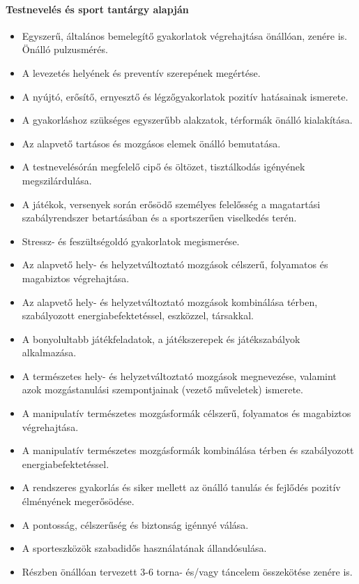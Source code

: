 \paragraph{Testnevelés és sport tantárgy alapján}
\begin{itemize}
\item Egyszerű, általános bemelegítő gyakorlatok végrehajtása önállóan, zenére is. Önálló pulzusmérés.
\item A levezetés helyének és preventív szerepének megértése.
\item A nyújtó, erősítő, ernyesztő és légzőgyakorlatok pozitív hatásainak ismerete.
\item A gyakorláshoz szükséges egyszerűbb alakzatok, térformák önálló kialakítása.
\item Az alapvető tartásos és mozgásos elemek önálló bemutatása.
\item A testnevelésórán megfelelő cipő és öltözet, tisztálkodás igényének megszilárdulása.
\item A játékok, versenyek során erősödő személyes felelősség a magatartási szabályrendszer betartásában és a sportszerűen viselkedés terén.
\item Stressz- és feszültségoldó gyakorlatok megismerése.
\item Az alapvető hely- és helyzetváltoztató mozgások célszerű, folyamatos és magabiztos végrehajtása.
\item Az alapvető hely- és helyzetváltoztató mozgások kombinálása térben, szabályozott energiabefektetéssel, eszközzel, társakkal.
\item A bonyolultabb játékfeladatok, a játékszerepek és játékszabályok alkalmazása.
\item A természetes hely- és helyzetváltoztató mozgások megnevezése, valamint azok mozgástanulási szempontjainak (vezető műveletek) ismerete.
\item A manipulatív természetes mozgásformák célszerű, folyamatos és magabiztos végrehajtása.
\item A manipulatív természetes mozgásformák kombinálása térben és szabályozott energiabefektetéssel.
\item A rendszeres gyakorlás és siker mellett az önálló tanulás és fejlődés pozitív élményének megerősödése.
\item A pontosság, célszerűség és biztonság igénnyé válása.
\item A sporteszközök szabadidős használatának állandósulása.
\item Részben önállóan tervezett 3-6 torna- és/vagy táncelem összekötése zenére is.

\end{itemize}
